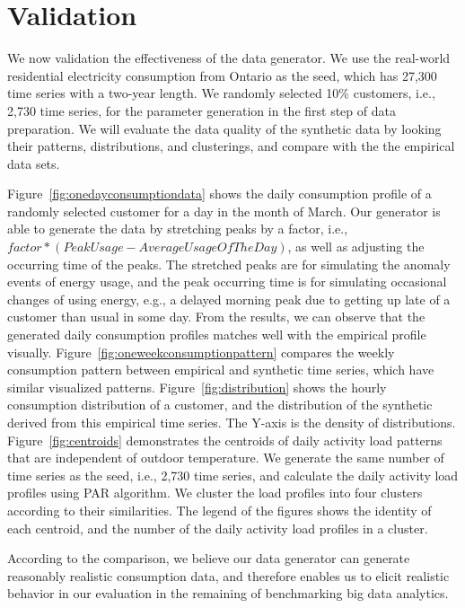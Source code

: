 \documentclass[a4paper,12pt]{llncs}
\newcommand{\ie}{i.e.}
\begin{document}
\section{Validation}
We now validation the effectiveness of the data generator. We use the real-world residential electricity consumption from Ontario as the seed, which has 27,300 time series with a two-year length. We randomly selected 10\% customers, \ie, 2,730 time series, for the parameter generation in the first step of data preparation. We will evaluate the data quality of the synthetic data by looking their patterns, distributions, and clusterings, and compare with the the empirical data sets. 

Figure~\ref{fig:onedayconsumptiondata} shows the daily consumption profile of a randomly selected customer for a day in the month of March. Our generator is able to generate the data by stretching peaks by a factor, \ie, $factor*(PeakUsage-AverageUsageOfTheDay)$, as well as adjusting the occurring time of the peaks. The stretched peaks are for simulating the anomaly events of energy usage, and the peak occurring time is for simulating occasional changes of using energy, e.g., a delayed morning peak due to getting up late of a customer than usual in some day. From the results, we can observe that the generated daily consumption profiles matches well with the empirical profile visually. Figure~\ref{fig:oneweekconsumptionpattern} compares the weekly consumption pattern between empirical and synthetic time series, which have similar visualized patterns. Figure~\ref{fig:distribution} shows the hourly consumption distribution of a customer, and the distribution of the synthetic derived from this empirical time series. The Y-axis is the  density of distributions. Figure~\ref{fig:centroids} demonstrates the centroids of daily activity load patterns that are independent of outdoor temperature. We generate the same number of time series as the seed, \ie, 2,730 time series, and calculate the daily activity load profiles using PAR algorithm. We cluster the load profiles into four clusters according to their similarities. The legend of the figures shows the identity of each centroid, and the number of the daily activity load profiles in a cluster.

According to the comparison, we believe our data generator can generate reasonably realistic consumption data, and therefore enables us to elicit realistic behavior in our evaluation in the remaining of benchmarking big data analytics.
\end{document}
